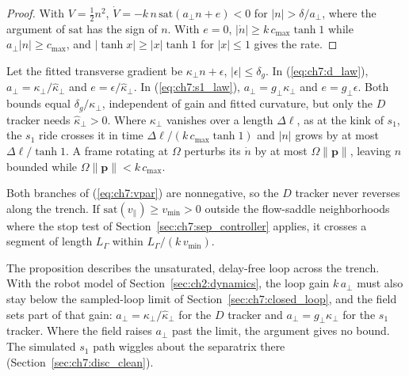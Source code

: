 \begin{proof}
With $V = \tfrac{1}{2}n^2$,
$\dot{V} = -k\,n\,\mathrm{sat}(a_\perp n + e) < 0$ for
$|n| > \delta/a_\perp$, where the argument of $\mathrm{sat}$ has the
sign of $n$. With $e = 0$, $|\dot{n}| \geq k\,c_{\max}\tanh 1$
while $a_\perp|n| \geq c_{\max}$, and $|\tanh x| \geq |x|\tanh 1$ for
$|x| \leq 1$ gives the rate.
\end{proof}

Let the fitted transverse gradient be $\kappa_\perp n + \epsilon$,
$|\epsilon| \leq \delta_g$. In (\ref{eq:ch7:d_law}),
$a_\perp = \kappa_\perp/\hat{\kappa}_\perp$ and
$e = \epsilon/\hat{\kappa}_\perp$. In (\ref{eq:ch7:s1_law}),
$a_\perp = g_\perp\kappa_\perp$ and $e = g_\perp\epsilon$. Both bounds
equal $\delta_g/\kappa_\perp$, independent of gain and fitted
curvature, but only the $D$ tracker needs $\hat{\kappa}_\perp > 0$.
Where $\kappa_\perp$ vanishes over a length $\Delta\ell$, as at the
kink of $s_1$, the $s_1$ ride crosses it in time $\Delta\ell/(k\,c_{\max}\tanh 1)$
and $|n|$ grows by at most $\Delta\ell/\tanh 1$. A frame rotating at
$\Omega$ perturbs its $\dot{n}$ by at most $\Omega\lVert\mathbf{p}\rVert$,
leaving $n$ bounded while $\Omega\lVert\mathbf{p}\rVert < k\,c_{\max}$.

Both branches of (\ref{eq:ch7:vpar}) are nonnegative, so the $D$ tracker
never reverses along the trench. If $\mathrm{sat}(v_\parallel) \geq v_{\min} > 0$ outside
the flow-saddle neighborhoods where the stop test of Section~\ref{sec:ch7:sep_controller} applies, it crosses a
segment of length $L_\Gamma$ within $L_\Gamma/(k\,v_{\min})$.

The proposition describes the unsaturated, delay-free loop across the
trench. With the robot model of Section~\ref{sec:ch2:dynamics}, the loop
gain $k\,a_\perp$ must also stay below the sampled-loop limit of
Section~\ref{sec:ch7:closed_loop}, and the field sets part of that gain:
$a_\perp = \kappa_\perp/\hat{\kappa}_\perp$ for the $D$ tracker and
$a_\perp = g_\perp\kappa_\perp$ for the $s_1$ tracker. Where the field
raises $a_\perp$ past the limit, the argument gives no bound. The
simulated $s_1$ path wiggles about the separatrix there
(Section~\ref{sec:ch7:disc_clean}).
